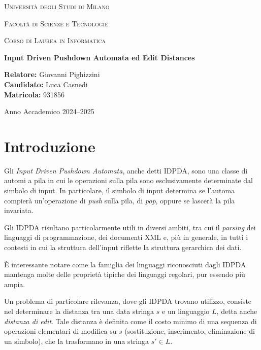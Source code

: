 \documentclass[a4paper,12pt]{report}
\theoremstyle{propositionstyle}
\begin{document}
    \begin{titlepage}
        \centering
        {\scshape\LARGE Università degli Studi di Milano \par}
        \vspace{1cm}
        {\scshape\Large Facoltà di Scienze e Tecnologie \par}
        \vspace{0.5cm}
        {\scshape\large Corso di Laurea in Informatica\par}
        \vspace{2cm}
        {\huge\bfseries Input Driven Pushdown Automata ed Edit Distances\par}
        \vspace{2cm}
        \begin{flushleft}
            \textbf{Relatore:} Giovanni Pighizzini\\
            \textbf{Candidato:} Luca Casnedi\\
            \textbf{Matricola:} 931856
        \end{flushleft}
        \vfill
        {\large Anno Accademico 2024--2025\par}
    \end{titlepage}

    \tableofcontents
    \clearpage


    \chapter{Introduzione}

    Gli \emph{Input Driven Pushdown Automata}, anche detti IDPDA, sono una classe di automi a pila in cui le operazioni sulla pila sono esclusivamente determinate dal simbolo di input.
    In particolare, il simbolo di input determina se l'automa compierà un'operazione di \emph{push} sulla pila, di \emph{pop}, oppure se lascerà la pila invariata.

    Gli IDPDA risultano particolarmente utili in diversi ambiti, tra cui il \emph{parsing} dei linguaggi di programmazione, dei documenti XML e, più in generale, in tutti i contesti in cui la struttura dell'input riflette la struttura gerarchica dei dati.

    È interessante notare come la famiglia dei linguaggi riconosciuti dagli IDPDA mantenga molte delle proprietà tipiche dei linguaggi regolari, pur essendo più ampia.

    Un problema di particolare rilevanza, dove gli IDPDA trovano utilizzo, consiste nel determinare la distanza tra una data stringa $s$ e un linguaggio $L$, detta anche \textit{distanza di edit}.
    Tale distanza è definita come il costo minimo di una sequenza di operazioni elementari di modifica su $s$ (sostituzione, inserimento, eliminazione di un simbolo), che la trasformano in una stringa $s' \in L$.
\end{document}

